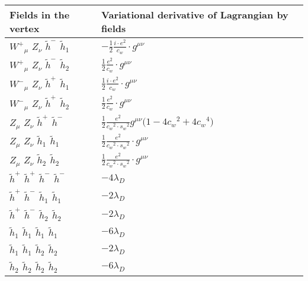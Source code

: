 \begin{center}
\begin{tabular}{|l|l|} \hline
Fields in the vertex & Variational derivative of Lagrangian by fields \\ \hline
$W^+{}_{\mu }$ \phantom{-} ${Z}_{\nu }$ \phantom{-} $\widetilde{h}^-{}_{}$ \phantom{-} $\widetilde{h}_1{}_{}$ \phantom{-}  &
	$-\frac{1}{2}\frac{ i \cdot e{}^2 }{ c_w}\cdot g^{\mu \nu} $\\[2mm]
$W^+{}_{\mu }$ \phantom{-} ${Z}_{\nu }$ \phantom{-} $\widetilde{h}^-{}_{}$ \phantom{-} $\widetilde{h}_2{}_{}$ \phantom{-}  &
	$\frac{1}{2}\frac{ e{}^2 }{ c_w}\cdot g^{\mu \nu} $\\[2mm]
$W^-{}_{\mu }$ \phantom{-} ${Z}_{\nu }$ \phantom{-} $\widetilde{h}^+{}_{}$ \phantom{-} $\widetilde{h}_1{}_{}$ \phantom{-}  &
	$\frac{1}{2}\frac{ i \cdot e{}^2 }{ c_w}\cdot g^{\mu \nu} $\\[2mm]
$W^-{}_{\mu }$ \phantom{-} ${Z}_{\nu }$ \phantom{-} $\widetilde{h}^+{}_{}$ \phantom{-} $\widetilde{h}_2{}_{}$ \phantom{-}  &
	$\frac{1}{2}\frac{ e{}^2 }{ c_w}\cdot g^{\mu \nu} $\\[2mm]
${Z}_{\mu }$ \phantom{-} ${Z}_{\nu }$ \phantom{-} $\widetilde{h}^+{}_{}$ \phantom{-} $\widetilde{h}^-{}_{}$ \phantom{-}  &
	$\frac{1}{2}\frac{ e{}^2 }{ c_w{}^2  \cdot s_w{}^2 }g^{\mu \nu} \big(1-4 c_w{}^2 +4 c_w{}^4 \big)$\\[2mm]
${Z}_{\mu }$ \phantom{-} ${Z}_{\nu }$ \phantom{-} $\widetilde{h}_1{}_{}$ \phantom{-} $\widetilde{h}_1{}_{}$ \phantom{-}  &
	$\frac{1}{2}\frac{ e{}^2 }{ c_w{}^2  \cdot s_w{}^2 }\cdot g^{\mu \nu} $\\[2mm]
${Z}_{\mu }$ \phantom{-} ${Z}_{\nu }$ \phantom{-} $\widetilde{h}_2{}_{}$ \phantom{-} $\widetilde{h}_2{}_{}$ \phantom{-}  &
	$\frac{1}{2}\frac{ e{}^2 }{ c_w{}^2  \cdot s_w{}^2 }\cdot g^{\mu \nu} $\\[2mm]
$\widetilde{h}^+{}_{}$ \phantom{-} $\widetilde{h}^+{}_{}$ \phantom{-} $\widetilde{h}^-{}_{}$ \phantom{-} $\widetilde{h}^-{}_{}$ \phantom{-}  &
	$-4 \lambda_{D}$\\[2mm]
$\widetilde{h}^+{}_{}$ \phantom{-} $\widetilde{h}^-{}_{}$ \phantom{-} $\widetilde{h}_1{}_{}$ \phantom{-} $\widetilde{h}_1{}_{}$ \phantom{-}  &
	$-2 \lambda_{D}$\\[2mm]
$\widetilde{h}^+{}_{}$ \phantom{-} $\widetilde{h}^-{}_{}$ \phantom{-} $\widetilde{h}_2{}_{}$ \phantom{-} $\widetilde{h}_2{}_{}$ \phantom{-}  &
	$-2 \lambda_{D}$\\[2mm]
$\widetilde{h}_1{}_{}$ \phantom{-} $\widetilde{h}_1{}_{}$ \phantom{-} $\widetilde{h}_1{}_{}$ \phantom{-} $\widetilde{h}_1{}_{}$ \phantom{-}  &
	$-6 \lambda_{D}$\\[2mm]
$\widetilde{h}_1{}_{}$ \phantom{-} $\widetilde{h}_1{}_{}$ \phantom{-} $\widetilde{h}_2{}_{}$ \phantom{-} $\widetilde{h}_2{}_{}$ \phantom{-}  &
	$-2 \lambda_{D}$\\[2mm]
$\widetilde{h}_2{}_{}$ \phantom{-} $\widetilde{h}_2{}_{}$ \phantom{-} $\widetilde{h}_2{}_{}$ \phantom{-} $\widetilde{h}_2{}_{}$ \phantom{-}  &
	$-6 \lambda_{D}$\\ \hline
\end{tabular}

\end{center}


